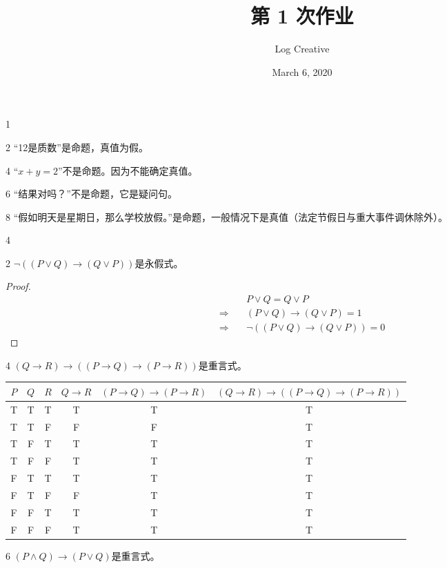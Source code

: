 \documentclass[12pt]{article}
\title{第 1 次作业}
\author{Log Creative}
\date{March 6, 2020}
\newenvironment{firstlayer}%
{\begin{list}{}{\renewcommand{\makelabel}[1]{\textbf{##1}.\hfil}
}}
{\end{list}}
\newenvironment{secondlayer}%
{\begin{list}{}{\renewcommand{\makelabel}[1]{(##1)\hfil}
}}
{\end{list}}
\begin{document}
\begin{CJK}{UTF8}{gbsn}

\maketitle

\begin{firstlayer}
  \item[1] 
  \begin{secondlayer}
    \item[2] ``12是质数''是命题，真值为假。
    \item[4] ``\(x+y=2\)''不是命题。因为不能确定真值。
    \item[6] ``结果对吗？''不是命题，它是疑问句。
    \item[8] ``假如明天是星期日，那么学校放假。''是命题，一般情况下是真值（法定节假日与重大事件调休除外）。
  \end{secondlayer}
  \item[4] 
  \begin{secondlayer}
    \item[2] \(\neg ((P\vee Q)\rightarrow (Q\vee P))\)是永假式。
    \begin{proof}
    \begin{align*}
      &P\vee Q=Q\vee P \\
      \Rightarrow \quad& (P\vee Q)\rightarrow (Q\vee P)=1 \\
      \Rightarrow \quad & \neg ((P\vee Q)\rightarrow (Q\vee P))=0
    \end{align*}
    \end{proof}
    \item[4] \((Q\rightarrow R)\rightarrow((P\rightarrow Q)\rightarrow (P\rightarrow R))\)是重言式。
    \begin{longtable}[]{@{}cccccc@{}}
        \toprule
        \(P\) & \(Q\) & \(R\) & \(Q\rightarrow R\) &
        \((P\rightarrow Q)\rightarrow (P\rightarrow R)\) &
        \((Q\rightarrow R)\rightarrow((P\rightarrow Q)\rightarrow (P\rightarrow R))\)\tabularnewline
        \midrule
        \endhead
        T & T & T & T & T & T\tabularnewline
        T & T & F & F & F & T\tabularnewline
        T & F & T & T & T & T\tabularnewline
        T & F & F & T & T & T\tabularnewline
        F & T & T & T & T & T\tabularnewline
        F & T & F & F & T & T\tabularnewline
        F & F & T & T & T & T\tabularnewline
        F & F & F & T & T & T\tabularnewline
        \bottomrule
    \end{longtable}
    \item[6] \((P\wedge Q)\rightarrow (P\vee Q)\)是重言式。


\end{secondlayer}
\end{firstlayer}
\end{CJK}
\end{document}
